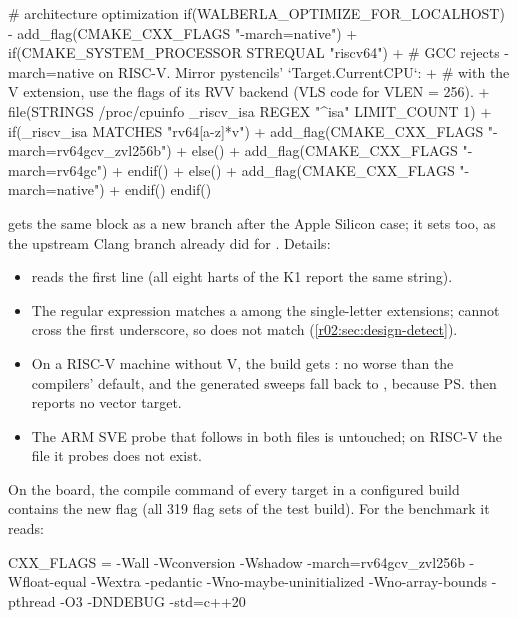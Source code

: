 \begin{diffcode}[nolol=false,caption={[The RISC-V case in GNU.cmake]The RISC-V case in \texttt{cmake/compileroptions/GNU.cmake} (commit \texttt{dbb1b400}).},label=r02:lst:gnu-fork]
 # architecture optimization
 if(WALBERLA_OPTIMIZE_FOR_LOCALHOST)
-  add_flag(CMAKE_CXX_FLAGS "-march=native")
+  if(CMAKE_SYSTEM_PROCESSOR STREQUAL "riscv64")
+    # GCC rejects -march=native on RISC-V. Mirror pystencils' `Target.CurrentCPU`:
+    # with the V extension, use the flags of its RVV backend (VLS code for VLEN = 256).
+    file(STRINGS /proc/cpuinfo _riscv_isa REGEX "^isa" LIMIT_COUNT 1)
+    if(_riscv_isa MATCHES "rv64[a-z]*v")
+      add_flag(CMAKE_CXX_FLAGS "-march=rv64gcv_zvl256b")
+    else()
+      add_flag(CMAKE_CXX_FLAGS "-march=rv64gc")
+    endif()
+  else()
+    add_flag(CMAKE_CXX_FLAGS "-march=native")
+  endif()
 endif()
\end{diffcode}

 gets the same block as a new  branch after the Apple
Silicon case; it sets  too, as the upstream Clang branch already
did for . Details:
\begin{itemize}
  \item {} reads the first 
        line (all eight harts of the K1 report the same string).
  \item The regular expression  matches a  among the
        single-letter extensions; \code{[a-z]*} cannot cross the first underscore, so
         does not match (\cref{r02:sec:design-detect}).
  \item On a RISC-V machine without V, the build gets : no worse
        than the compilers' default, and the generated sweeps fall back to
        , because \ps{} then reports no vector target.
  \item The ARM SVE probe that follows in both files is untouched; on RISC-V the file
        it probes does not exist.
\end{itemize}
On the board, the compile command of every target in a configured build contains the
new flag (all 319 flag sets of the test build). For the benchmark it reads:
\begin{plaincode}[basicstyle=\ttfamily\scriptsize]
CXX_FLAGS = -Wall -Wconversion -Wshadow -march=rv64gcv_zvl256b -Wfloat-equal -Wextra -pedantic
            -Wno-maybe-uninitialized -Wno-array-bounds -pthread -O3 -DNDEBUG -std=c++20
\end{plaincode}

